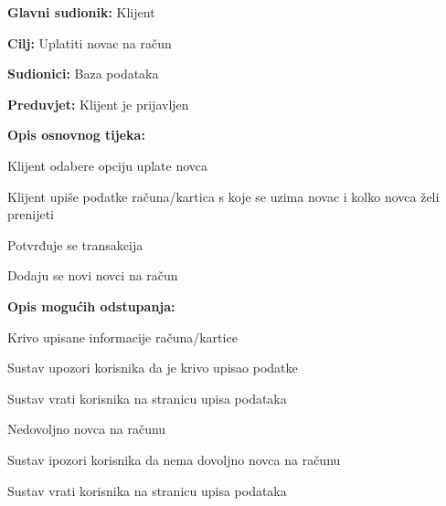 \noindent {}
\begin{packed_item}
	
	\item \textbf{Glavni sudionik: }Klijent
	\item  \textbf{Cilj:} Uplatiti novac na račun
	\item  \textbf{Sudionici:} Baza podataka
	\item  \textbf{Preduvjet:} Klijent je prijavljen
	\item  \textbf{Opis osnovnog tijeka:}
	
	\item[] \begin{packed_enum}
		
		\item Klijent odabere opciju uplate novca
		\item Klijent upiše podatke računa/kartica s koje se uzima novac i kolko novca želi prenijeti
		\item Potvrđuje se transakcija
		\item Dodaju se novi novci na račun
		
		
	\end{packed_enum}
	
	\item  \textbf{Opis mogućih odstupanja:}
	
	\item[] \begin{packed_item}
		
		\item[2.a] Krivo upisane informacije računa/kartice
		\item[] \begin{packed_enum}
			
			\item Sustav upozori korisnika da je krivo upisao podatke
			\item Sustav vrati korisnika na stranicu upisa podataka
			
			
		\end{packed_enum}
		
		\item[3.a] Nedovoljno novca na računu
		\item[] \begin {packed_enum}
		
		\item Sustav ipozori korisnika da nema dovoljno novca na računu
		\item Sustav vrati korisnika na stranicu upisa podataka
		
	\end{packed_enum}
	
	
\end{packed_item}	

\end{packed_item}

